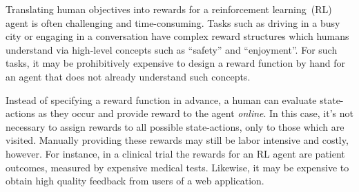 \documentclass{article}
\begin{document}
Translating human objectives into rewards for a reinforcement learning~(RL) agent is often challenging and time-consuming.
Tasks such as driving in a busy city or engaging in a conversation have complex reward structures which humans understand via high-level concepts such as ``safety'' and ``enjoyment''.
For such tasks, it may be prohibitively expensive to design a reward function by hand for an agent that does not already understand such concepts. %
%

Instead of specifying a reward function in advance, a human can evaluate state-actions as they occur and provide reward to the agent \emph{online}. %
In this case, it's not necessary to assign rewards to all possible state-actions, only to those which are visited.
Manually providing these rewards may still be labor intensive and costly, however.
For instance, in a clinical trial the rewards for an RL agent are patient outcomes, measured by expensive medical tests.
Likewise, it may be expensive to obtain high quality feedback from users of a web application.
\end{document}

